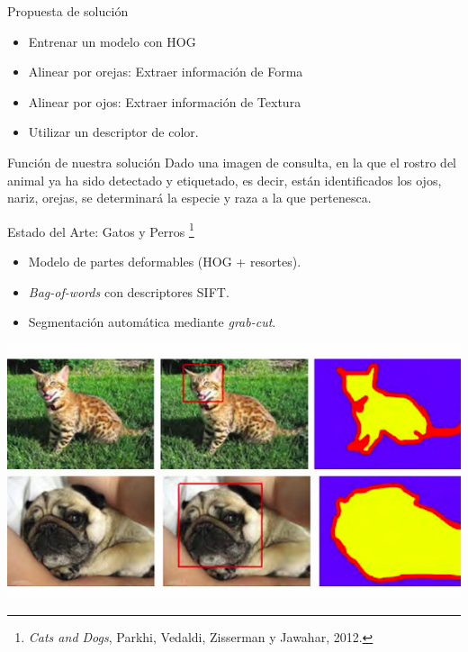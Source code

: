 \documentclass{beamer}
\begin{document}
	\begin{frame}{Propuesta de solución}
\begin{itemize}
\item{
		Entrenar un modelo con HOG
}
\item{
		Alinear por orejas: Extraer información de Forma
}
\item{
		Alinear por ojos: Extraer información de Textura
}
\item{
		Utilizar un descriptor de color.
}
\end{itemize}
	\end{frame}
	\begin{frame}{Función de nuestra solución}
		Dado una imagen de consulta, en la que el rostro del animal ya ha sido detectado y etiquetado, es decir, están identificados los ojos, nariz, orejas, se determinará la especie y raza a la que pertenesca. 
	\end{frame}

    \begin{frame}{Estado del Arte: Gatos y Perros \footnote{\emph{Cats and
        Dogs}, Parkhi, Vedaldi, Zisserman y Jawahar, 2012.}}
        \begin{itemize}
            \item Modelo de partes deformables (HOG + resortes).
            \item \emph{Bag-of-words} con descriptores SIFT. 
            \item Segmentación automática mediante \emph{grab-cut}.
        \end{itemize}
        \begin{center}
            \includegraphics[scale=0.3]{imagen/catsanddogs_annotation}
        \end{center}
	\end{frame}
\end{document}
